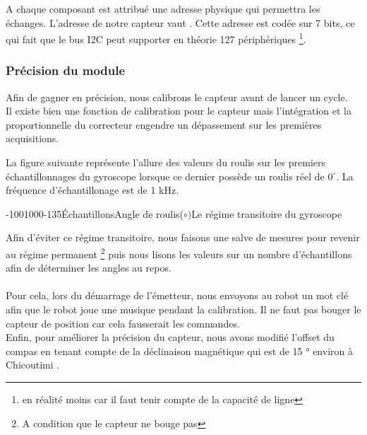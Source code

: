 A chaque composant est attribué une adresse physique qui permettra les échanges. L'adresse de notre capteur vaut . Cette adresse est codée sur 7 bits, ce qui fait que le bus I2C peut supporter en théorie 127 périphériques \footnote{en  réalité moins car il faut tenir compte de la capacité de ligne}.\\

\subsubsection{Précision du module}

Afin de gagner en précision, nous calibrons le capteur avant de lancer un cycle. \\Il existe bien une fonction de calibration pour le capteur mais l'intégration et la proportionnelle du correcteur engendre un dépassement sur les premières acquisitions. 

La figure suivante représente l'allure des valeurs du roulis sur les premiers échantillonnages du gyroscope lorsque ce dernier possède un roulis réel de $0^{\circ}$. La fréquence d'échantillonage est de 1 kHz.

\begin{graphicFigure}{0.6}{0.6}{-100}{1000}{-1}{35}{Échantillons}{Angle de roulis($\circ)$}{Le régime transitoire du gyroscope}
\end{graphicFigure}

Afin d'éviter ce régime transitoire, nous faisons une salve de mesures pour revenir au régime permanent \footnote{A condition que le capteur ne bouge pas} puis nous lisons les valeurs sur un nombre d'échantillons afin de déterminer les angles au repos. \\

\\

Pour cela, lors du démarrage de l'émetteur, nous envoyons au robot un mot clé afin que le robot joue une musique pendant la calibration. Il ne faut pas bouger le capteur de position car cela fausserait les commandes. \\

Enfin, pour améliorer la précision du capteur, nous avons modifié l'offset du compas en tenant compte de la déclinaison magnétique qui est de 15 ° environ à Chicoutimi \cite{mag}.


